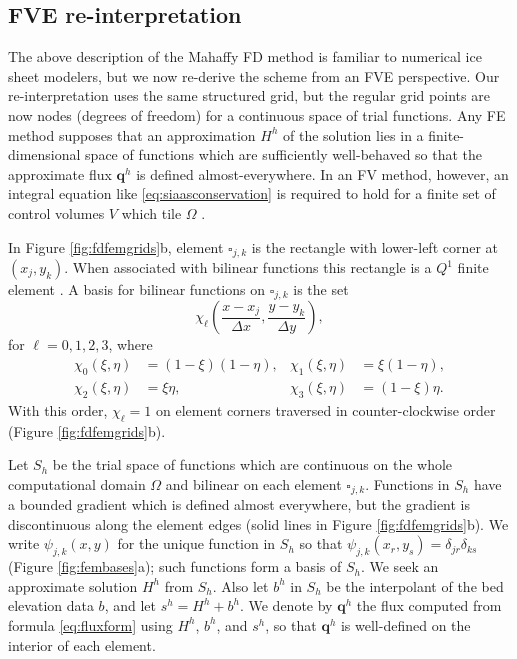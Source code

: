 \documentclass[twocolumn,letterpaper]{igs}
\newcommand\bq{\mathbf{q}}
\begin{document}
\subsection{FVE re-interpretation}

The above description of the Mahaffy FD method is familiar to numerical ice sheet modelers, but we now re-derive the scheme from an FVE perspective.  Our re-interpretation uses the same structured grid, but the regular grid points are now nodes (degrees of freedom) for a continuous space of trial functions.  Any FE method supposes that an approximation $H^h$ of the solution lies in a finite-dimensional space of functions which are sufficiently well-behaved so that the approximate flux $\bq^h$ is defined almost-everywhere.  In an FV method, however, an integral equation like \eqref{eq:siaasconservation} is required to hold for a finite set of control volumes $V$ which tile $\Omega$ \citep{LeVeque2002}.

In Figure \ref{fig:fdfemgrids}b, element $\square_{j,k}$ is the rectangle with lower-left corner at $(x_j,y_k)$.  When associated with bilinear functions this rectangle is a $Q^1$ finite element \citep{Elmanetal2005}.  A basis for bilinear functions on $\square_{j,k}$ is the set
\begin{equation}
\chi_\ell \left(\frac{x-x_j}{\Delta x},\frac{y-y_k}{\Delta y}\right), \label{eq:elementbasis}
\end{equation}
for $\ell=0,1,2,3$, where
\begin{align*}
\chi_0(\xi,\eta) &= \left(1-\xi\right) \left(1-\eta\right), & \chi_1(\xi,\eta) &= \xi \left(1-\eta\right), \\
\chi_2(\xi,\eta) &= \xi \eta, & \chi_3(\xi,\eta) &= \left(1-\xi\right) \eta.
\end{align*}
With this order, $\chi_\ell=1$ on element corners traversed in counter-clockwise order (Figure \ref{fig:fdfemgrids}b).  

Let $S_h$ be the trial space of functions which are continuous on the whole computational domain $\Omega$ and bilinear on each element $\square_{j,k}$.  Functions in $S_h$ have a bounded gradient which is defined almost everywhere, but the gradient is discontinuous along the element edges (solid lines in Figure \ref{fig:fdfemgrids}b).  We write $\psi_{j,k}(x,y)$ for the unique function in $S_h$ so that $\psi_{j,k}(x_r,y_s) = \delta_{jr} \delta_{ks}$ (Figure \ref{fig:fembases}a); such functions form a basis of $S_h$.  We seek an approximate solution $H^h$ from $S_h$.  Also let $b^h$ in $S_h$ be the interpolant of the bed elevation data $b$, and let $s^h=H^h+b^h$.  We denote by $\bq^h$ the flux computed from formula \eqref{eq:fluxform} using $H^h$, $b^h$, and $s^h$, so that $\bq^h$ is well-defined on the interior of each element.
\end{document}
